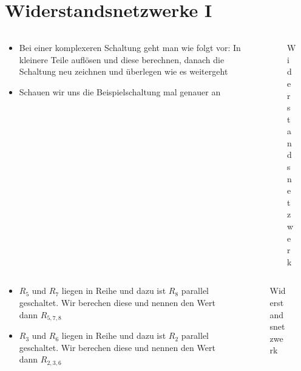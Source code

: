 
\section{Widerstandsnetzwerke I}
\label{section:reihe_parallel_widerstandsnetz_1}
\begin{frame}%

\begin{columns}
    \begin{column}{0.48\textwidth}
    \begin{itemize}
  \item Bei einer komplexeren Schaltung geht man wie folgt vor: In kleinere Teile auflösen und diese berechnen, danach die Schaltung neu zeichnen und überlegen wie es weitergeht
  \item Schauen wir uns die Beispielschaltung mal genauer an
  \end{itemize}

    \end{column}
   \begin{column}{0.48\textwidth}
       
\begin{figure}
    \caption{\scriptsize Widerstandsnetzwerk}
    \label{e_widerstandsnetzwerk_1}
\end{figure}


   \end{column}
\end{columns}

\end{frame}

\begin{frame}
\begin{columns}
    \begin{column}{0.48\textwidth}
    \begin{itemize}
  \item $R_5$ und $R_7$ liegen in Reihe und dazu ist $R_8$ parallel geschaltet. Wir berechen diese und nennen den Wert dann $R_{ 5,7,8 }$
  \item $R_3$ und $R_6$ liegen in Reihe und dazu ist $R_2$ parallel geschaltet. Wir berechen diese und nennen den Wert dann $R_{ 2,3,6 }$
  \end{itemize}

    \end{column}
   \begin{column}{0.48\textwidth}
       
\begin{figure}
    \caption{\scriptsize Widerstandsnetzwerk}
    \label{e_widerstandsnetzwerk_1}
\end{figure}


   \end{column}
\end{columns}

\end{frame}

